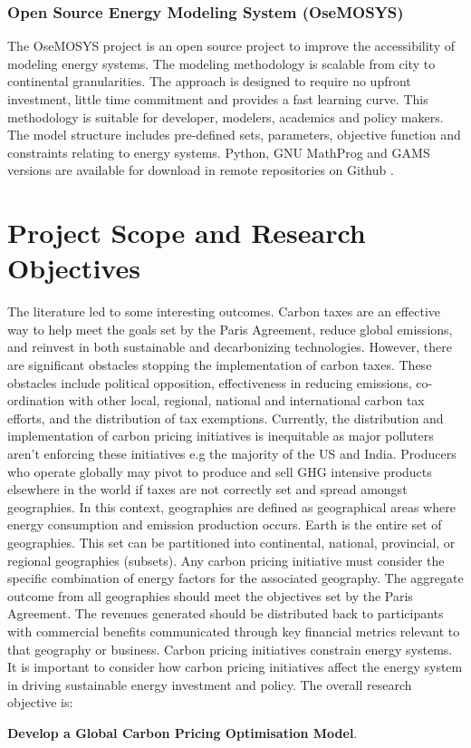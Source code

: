 \documentclass[12pt]{article}
\begin{document}
\subsubsection{Open Source Energy Modeling System (OseMOSYS)}
The OseMOSYS project is an open source project to improve the accessibility of modeling energy systems.
The modeling methodology is scalable from city to continental granularities. The approach is designed to require no upfront investment,
little time commitment and provides a fast learning curve. This methodology is suitable for developer, modelers, academics and policy makers.
The model structure includes pre-defined sets, parameters, objective function and constraints relating to energy systems. 
Python, GNU MathProg and GAMS versions are available
for download in remote repositories on Github \cite{W:13}.
\newpage

\section{Project Scope and Research Objectives}
The literature led to some interesting outcomes. 
Carbon taxes are an effective way to help meet the goals set by the Paris Agreement, reduce global emissions, and reinvest in both sustainable and decarbonizing technologies.
However, there are significant obstacles stopping the implementation of carbon taxes. 
These obstacles include political opposition, effectiveness in reducing emissions, co-ordination with other local, regional, national and international carbon tax efforts, and the distribution of tax exemptions.
Currently, the distribution and implementation of carbon pricing initiatives is inequitable as major polluters aren't enforcing these initiatives e.g the majority of the US and India.
Producers who operate globally may pivot to produce and sell GHG intensive products elsewhere in the world if taxes are not correctly set and spread amongst geographies.
In this context, geographies are defined as geographical areas where energy consumption and emission production occurs. 
Earth is the entire set of geographies.
This set can be partitioned into continental, national, provincial, or regional geographies (subsets).
Any carbon pricing initiative must consider the specific combination of energy factors for the associated geography.
The aggregate outcome from all geographies should meet the objectives set by the Paris Agreement.
The revenues generated should be distributed back to participants with commercial benefits communicated through key financial metrics relevant to that geography or business.
Carbon pricing initiatives constrain energy systems.
It is important to consider how carbon pricing initiatives affect the energy system in driving sustainable energy investment and policy.
The overall research objective is: 
\begin{center}
\textbf{Develop a Global Carbon Pricing Optimisation Model}.
\end{center}
\end{document}
